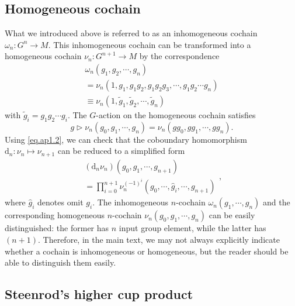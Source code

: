 \documentclass[%
 reprint,
 amsmath,amssymb,
 aps,
prb,
]{revtex4-2}
\begin{document}
\subsection{Homogeneous cochain}

What we introduced above is referred to as an inhomogeneous cochain $\omega _{n} :G^{n} \rightarrow M$. This inhomogeneous cochain can be transformed into a homogeneous cochain $\nu _{n} :G^{n+1} \rightarrow M$ by the correspondence 
\begin{equation}
\begin{array}{ l }
\omega _{n}( g_{1} ,g_{2} ,\cdots ,g_{n})\\
=\nu _{n}( 1,g_{1} ,g_{1} g_{2} ,g_{1} g_{2} g_{3} ,\cdots ,g_{1} g_{2} \cdots g_{n})\\
\equiv \nu _{n}( 1,\tilde{g}_{1} ,\tilde{g}_{2} ,\cdots ,\tilde{g}_{n})
\end{array} \label{eq.ap1.7}
\end{equation}
with $\tilde{g}_{i} =g_{1} g_{2} \cdots g_{i}$. The $G$-action on the homogeneous cochain satisfies 
\begin{equation}
g\triangleright \nu _{n}( g_{0} ,g_{1} ,\cdots ,g_{n}) =\nu _{n}( gg_{0} ,gg_{1} ,\cdots ,gg_{n}) . \label{eq.ap1.8}
\end{equation}
Using \eqref{eq.ap1.2}, we can check that the coboundary homomorphism $\mathrm{d}_{n} :\nu _{n} \mapsto \nu _{n+1}$ can be reduced to a simplified form 
\begin{equation}
\begin{array}{ l }
(\mathrm{d}_{n} \nu _{n})( g_{0} ,g_{1} ,\cdots ,g_{n+1})\\
=\prod\nolimits _{i=0}^{n+1} \nu _{n}^{( -1)^{i}}( g_{0} ,\cdots ,\hat{g}_{i} ,\cdots ,g_{n+1})
\end{array} , \label{eq.ap1.9}
\end{equation}
where $\hat{g}_{i}$ denotes omit $g_{i}$. The inhomogeneous $n$-cochain $\omega _{n}( g_{1} ,\cdots ,g_{n})$ and the corresponding homogeneous $n$-cochain $\nu _{n}( g_{0} ,g_{1} ,\cdots ,g_{n})$ can be easily distinguished: the former has $n$ input group element, while the latter has $( n+1)$. Therefore, in the main text, we may not always explicitly indicate whether a cochain is inhomogeneous or homogeneous, but the reader should be able to distinguish them easily.

\subsection{\label{ap:cup product}Steenrod's higher cup product}
\end{document}
